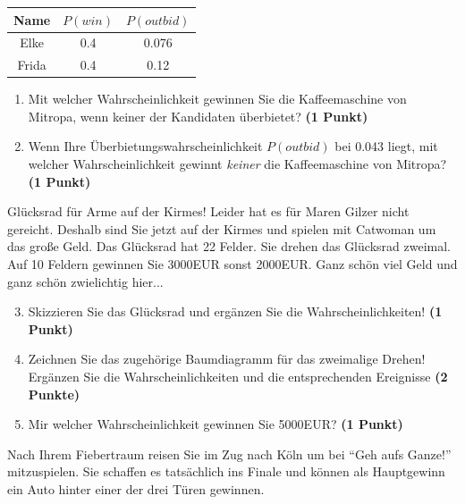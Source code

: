 \documentclass[a4paper, 9pt]{scrartcl}\usepackage[]{graphicx}\usepackage[]{xcolor}
\begin{document}
\begin{center}
\begin{tabular}{ccc}
  \toprule
  Name & $P(win)$ & $P(outbid)$\\
  \midrule
  Elke & 0.4 & 0.076\\
  Frida & 0.4 & 0.12 \\
  \bottomrule
\end{tabular}
\end{center}

\begin{enumerate}
\item Mit welcher Wahrscheinlichkeit gewinnen Sie die Kaffeemaschine von
  Mitropa, wenn keiner der Kandidaten {\"u}berbietet? \textbf{(1 Punkt)}
\item Wenn Ihre {\"U}berbietungswahrscheinlichkeit $P(outbid)$ bei
  0.043 liegt, mit welcher Wahrscheinlichkeit gewinnt
  \textit{keiner} die Kaffeemaschine von Mitropa? \textbf{(1 Punkt)}
\end{enumerate}

Gl{\"u}cksrad f{\"u}r Arme auf der Kirmes! Leider hat es f{\"u}r Maren Gilzer nicht
gereicht. Deshalb sind Sie jetzt auf der Kirmes und spielen mit
Catwoman um das gro{\ss}e Geld. Das Gl{\"u}cksrad hat 22
Felder. Sie drehen das Gl{\"u}cksrad zweimal. Auf 10 Feldern
gewinnen Sie 3000EUR sonst 2000EUR. Ganz sch{\"o}n viel Geld
und ganz sch{\"o}n zwielichtig hier...

\begin{enumerate}
  \setcounter{enumi}{2}  
\item Skizzieren Sie das Gl{\"u}cksrad und erg{\"a}nzen Sie die
  Wahrscheinlichkeiten! \textbf{(1 Punkt)}
\item Zeichnen Sie das zugeh{\"o}rige Baumdiagramm f{\"u}r das zweimalige Drehen!
  Erg{\"a}nzen Sie die Wahrscheinlichkeiten und die entsprechenden Ereignisse
  \textbf{(2 Punkte)}
\item Mir welcher Wahrscheinlichkeit gewinnen Sie 5000EUR? \textbf{(1
    Punkt)}
\end{enumerate}

Nach Ihrem Fiebertraum reisen Sie im Zug nach K{\"o}ln um bei "`Geh aufs
Ganze!"' mitzuspielen. Sie schaffen es tats{\"a}chlich ins Finale und k{\"o}nnen
als Hauptgewinn ein Auto hinter einer der drei T{\"u}ren gewinnen. 
\end{document}
